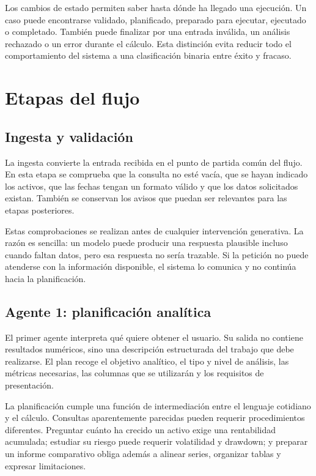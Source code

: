 Los cambios de estado permiten saber hasta dónde ha llegado una ejecución. Un caso puede encontrarse validado, planificado, preparado para ejecutar, ejecutado o completado. También puede finalizar por una entrada inválida, un análisis rechazado o un error durante el cálculo. Esta distinción evita reducir todo el comportamiento del sistema a una clasificación binaria entre éxito y fracaso.

\section{Etapas del flujo}

\subsection{Ingesta y validación}

La ingesta convierte la entrada recibida en el punto de partida común del flujo. En esta etapa se comprueba que la consulta no esté vacía, que se hayan indicado los activos, que las fechas tengan un formato válido y que los datos solicitados existan. También se conservan los avisos que puedan ser relevantes para las etapas posteriores.

Estas comprobaciones se realizan antes de cualquier intervención generativa. La razón es sencilla: un modelo puede producir una respuesta plausible incluso cuando faltan datos, pero esa respuesta no sería trazable. Si la petición no puede atenderse con la información disponible, el sistema lo comunica y no continúa hacia la planificación.

\subsection{Agente 1: planificación analítica}

El primer agente interpreta qué quiere obtener el usuario. Su salida no contiene resultados numéricos, sino una descripción estructurada del trabajo que debe realizarse. El plan recoge el objetivo analítico, el tipo y nivel de análisis, las métricas necesarias, las columnas que se utilizarán y los requisitos de presentación.

La planificación cumple una función de intermediación entre el lenguaje cotidiano y el cálculo. Consultas aparentemente parecidas pueden requerir procedimientos diferentes. Preguntar cuánto ha crecido un activo exige una rentabilidad acumulada; estudiar su riesgo puede requerir volatilidad y drawdown; y preparar un informe comparativo obliga además a alinear series, organizar tablas y expresar limitaciones.

